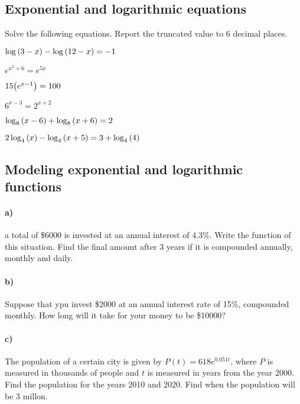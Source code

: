 \documentclass[../main.tex]{subfiles}
\begin{document}
\subsection{Exponential and logarithmic equations}
Solve the following equations. 
Report the truncated value to 6 decimal places.
\begin{enumerate}[label=\alph*]
    \begin{minipage}[c]{0.45\textwidth}
    \item $\log\qty(3-x)-\log\qty(12-x)=-1$
    \item $e^{x^2+6} = e^{5x}$
    \item $15\qty(e^{x-1}) = 100$
    \end{minipage}
    \hfill
    \begin{minipage}[c]{0.45\textwidth}
    \item $6^{x-3} = 2^{x+2}$
    \item $\log_8\qty(x-6)+\log_8\qty(x+6) = 2$
    \item $2\log_4\qty(x) - \log_4\qty(x+5) = 3 + \log_4\qty(4)$
    \end{minipage}
\end{enumerate}

\subsection{Modeling exponential and logarithmic functions}

\paragraph{a)} a total of \$\num{6000} is invested at an annual interest of 4.3\%.
Write the function of this situation.
Find the final amount after 3 years if it is compounded annually, monthly and daily.

\paragraph{b)} Suppose that ypu invest \$\num{2000} at an annual interest rate of 15\%, compounded monthly.
How long will it take for your money to be \$\num{10000}?

\paragraph{c)} The population of a certain city is given by $P(t)=618e^{0.051t}$, where $P$ is measured in thousands of people and $t$ is measured in years from the year $2000$.
Find the population for the years 2010 and 2020.
Find when the population will be 3 millon.
\end{document}
